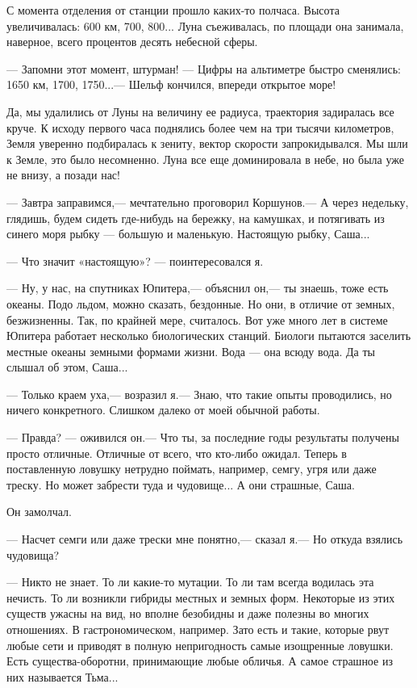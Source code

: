 \documentclass[11pt,a4paper,oneside]{article}
\begin{document}
С момента отделения от станции прошло каких-то полчаса. Высота увеличивалась: 600 км, 700, 800... Луна съеживалась, по площади она занимала, наверное, всего процентов десять небесной сферы.

— Запомни этот момент, штурман! — Цифры на альтиметре быстро сменялись: 1650 км, 1700, 1750...— Шельф кончился, впереди открытое море!

Да, мы удалились от Луны на величину ее радиуса, траектория задиралась все круче. К исходу первого часа поднялись более чем на три тысячи километров, Земля уверенно подбиралась к зениту, вектор скорости запрокидывался. Мы шли к Земле, это было несомненно. Луна все еще доминировала в небе, но была уже не внизу, а позади нас!

— Завтра заправимся,— мечтательно проговорил Коршунов.— А через недельку, глядишь, будем сидеть где-нибудь на бережку, на камушках, и потягивать из синего моря рыбку — большую и маленькую. Настоящую рыбку, Саша...

— Что значит «настоящую»? — поинтересовался я.

— Ну, у нас, на спутниках Юпитера,— объяснил он,— ты знаешь, тоже есть океаны. Подо льдом, можно сказать, бездонные. Но они, в отличие от земных, безжизненны. Так, по крайней мере, считалось. Вот уже много лет в системе Юпитера работает несколько биологических станций. Биологи пытаются заселить местные океаны земными формами жизни. Вода — она всюду вода. Да ты слышал об этом, Саша...

— Только краем уха,— возразил я.— Знаю, что такие опыты проводились, но ничего конкретного. Слишком далеко от моей обычной работы.

— Правда? — оживился он.— Что ты, за последние годы результаты получены просто отличные. Отличные от всего, что кто-либо ожидал. Теперь в поставленную ловушку нетрудно поймать, например, семгу, угря или даже треску. Но может забрести туда и чудовище... А они страшные, Саша.

Он замолчал.

— Насчет семги или даже трески мне понятно,— сказал я.— Но откуда взялись чудовища?

— Никто не знает. То ли какие-то мутации. То ли там всегда водилась эта нечисть. То ли возникли гибриды местных и земных форм. Некоторые из этих существ ужасны на вид, но вполне безобидны и даже полезны во многих отношениях. В гастрономическом, например. Зато есть и такие, которые рвут любые сети и приводят в полную непригодность самые изощренные ловушки. Есть существа-оборотни, принимающие любые обличья. А самое страшное из них называется Тьма...
\end{document}
